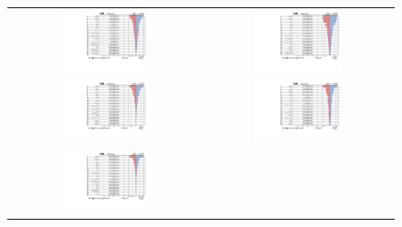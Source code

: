  \begin{figure}[tbh!]
 \begin{center}
 \begin{tabular}{cc}
 \includegraphics[width=0.48\textwidth]{figures/Appendix/Impact/Impact_TensorU_expected}&
  \includegraphics[width=0.48\textwidth]{figures/Appendix/Impact/Impact_TensorC_expected}\\
   \includegraphics[width=0.48\textwidth]{figures/Appendix/Impact/Impact_VecU_expected}&
  \includegraphics[width=0.48\textwidth]{figures/Appendix/Impact/Impact_VecC_expected}\\
   \includegraphics[width=0.48\textwidth]{figures/Appendix/Impact/Impact_ScalarU_expected}&

\end{tabular}
\end{center}
\end{figure}
